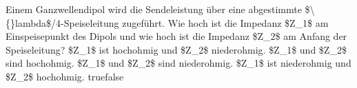     {Einem Ganzwellendipol wird die Sendeleistung über eine abgestimmte \$\textbackslash\{\}lambda\$/4-Speiseleitung zugeführt. Wie hoch ist die Impedanz \$Z\_1\$ am Einspeisepunkt des Dipols und wie hoch ist die Impedanz \$Z\_2\$ am Anfang der Speiseleitung?}
    {\$Z\_1\$ ist hochohmig und \$Z\_2\$ niederohmig.}
    {\$Z\_1\$ und \$Z\_2\$ sind hochohmig.}
    {\$Z\_1\$ und \$Z\_2\$ sind niederohmig.}
    {\$Z\_1\$ ist niederohmig und \$Z\_2\$ hochohmig.}
    {true}{false}